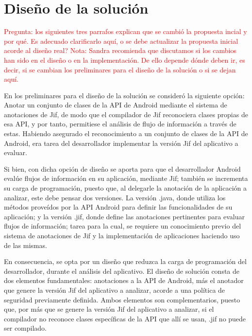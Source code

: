 
\section{Diseño de la solución}

\textcolor{red}
{Pregunta: los siguientes tres parrafos explican que se cambió la propuesta
incial y por qué. Es adecuado clarificarlo aquí, o se debe actualizar la
propuesta inicial acorde al diseño real? Nota: Sandra recomienda que discutamos
si los cambios han sido en el diseño o en la implementación. De ello depende
dónde deben ir, es decir, si se cambian los preliminares para el diseño de la
solución o si se dejan aquí.}

En los preliminares para el diseño de la solución se consideró la siguiente
opción: Anotar un conjunto de clases de la API de Android mediante el sistema de
anotaciones de Jif, de modo que el compilador de Jif reconociera clases propias
de esa API, y por tanto, permitiese el análisis de flujo de información a través
de estas. Habiendo asegurado el reconocimiento a un
conjunto de clases de la API de Android, era tarea del desarrollador implementar
la versión Jif del aplicativo a evaluar.

Si bien, con dicha opción de diseño se aporta para que el desarrollador
Android evalúe flujos de información en su aplicación, mediante Jif; también se
incrementa su carga de programación, puesto que, al delegarle la anotación de la
aplicación a analizar, este debe pensar dos versiones. La versión .java, donde
utiliza los métodos proveídos por la API Android para definir las
funcionalidades de su aplicación; y la versión .jif, donde define las anotaciones pertinentes para
evaluar flujos de información; tarea para la cual, se requiere un conocimiento
previo del sistema de anotaciones de Jif y la implementación de aplicaciones
haciendo uso de las mismas.

En consecuencia, se opta por un diseño que reduzca la carga de programación
del desarrollador, durante el análisis del aplicativo.\newline 
El diseño de solución consta de dos elementos fundamentales: anotaciones a la
API de Android, más el anotador que genere la versión Jif del aplicativo a
analizar, acorde a una política de seguridad previamente definida.\newline 
Ambos elementos son complementarios, puesto que, por más que se genere la
versión Jif del aplicativo a analizar, si el compilador no reconoce clases
específicas de la API que allí se usan, .jif no puede ser compilado.

